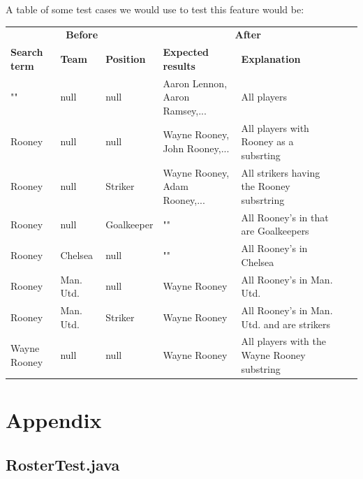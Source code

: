 \documentclass{article}
\begin{document}
A table of some test cases we would use to test this feature would be:
\begin{table}[H]
\begin{tabular}{|l|l|l|l|l|ll}
\cline{1-5}
\multicolumn{3}{|c|}{\textbf{Before}} & \multicolumn{2}{c|}{\textbf{After}}\\ \cline{1-5}
\textbf{Search term} & \textbf{Team}  & \textbf{Position}   & \textbf{Expected results} & \textbf{Explanation} &  &\\ \cline{1-5}
""           & null            & null       & Aaron Lennon, Aaron Ramsey,...             & All players                                      &  &  \\ \cline{1-5}
Rooney       & null            & null       & Wayne Rooney, John Rooney,... & All players with Rooney as a subsrting         &  &  \\ \cline{1-5}
Rooney       & null            & Striker    & Wayne Rooney, Adam Rooney,...              & All strikers having the Rooney subsrtring      &  &  \\ \cline{1-5}
Rooney       & null            & Goalkeeper & ""                                           & All Rooney's in that are Goalkeepers             &  &  \\ \cline{1-5}
Rooney       & Chelsea         & null       & ""                                           & All Rooney's in Chelsea                          &  &  \\ \cline{1-5}
Rooney       & Man. Utd. & null       & Wayne Rooney                               & All Rooney's in Man. Utd.                  &  &  \\ \cline{1-5}
Rooney       & Man. Utd. & Striker    & Wayne Rooney                               & All Rooney's in Man. Utd. and are strikers &  &  \\ \cline{1-5}
Wayne Rooney & null            & null       & Wayne Rooney                               & All players with the Wayne Rooney substring   &  &  \\ \cline{1-5}
\end{tabular}
\end{table}


\newpage
\section*{Appendix}
\subsection*{RosterTest.java}
\end{document}

